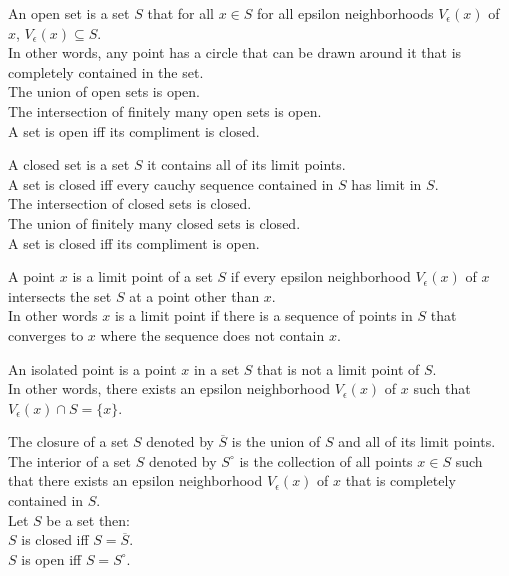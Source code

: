 \documentclass[answers,12pt,addpoints]{exam}
\begin{document}
\begin{definition}
    An open set is a set $S$ that for all $x \in S$ for all epsilon neighborhoods $V_\epsilon(x)$ of $x$, $V_\epsilon(x) \subseteq S$.\\
    In other words, any point has a circle that can be drawn around it that is completely contained in the set.\\
    The union of open sets is open.\\
    The intersection of finitely many open sets is open.\\
    A set is open iff its compliment is closed.
\end{definition}
\begin{definition}
    A closed set is a set $S$ it contains all of its limit points.\\
    A set is closed iff every cauchy sequence contained in $S$ has limit in $S$.\\
    The intersection of closed sets is closed.\\
    The union of finitely many closed sets is closed.\\
    A set is closed iff its compliment is open.
\end{definition}
\begin{definition}
    A point $x$ is a limit point of a set $S$ if every epsilon neighborhood $V_\epsilon(x)$ of $x$ intersects the set $S$ at a point other than $x$.\\
    In other words $x$ is a limit point if there is a sequence of points in $S$ that converges to $x$ where the sequence does not contain $x$.
\end{definition}
\begin{definition}
    An isolated point is a point $x$ in a set $S$ that is not a limit point of $S$.\\
    In other words, there exists an epsilon neighborhood $V_\epsilon(x)$ of $x$ such that $V_\epsilon(x) \cap S = \{x\}$.
\end{definition}
\begin{definition}
    The closure of a set $S$ denoted by $\overline{S}$ is the union of $S$ and all of its limit points.\\
    The interior of a set $S$ denoted by $S^\circ$ is the collection of all points $x \in S$ such that there exists an epsilon neighborhood $V_\epsilon(x)$ of $x$ that is completely contained in $S$.\\
    Let $S$ be a set then:\\
    $S$ is closed iff $S = \overline{S}$.\\
    $S$ is open iff $S = S^\circ$.
\end{definition}
\end{document}
